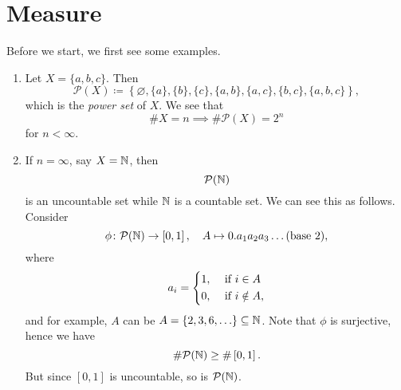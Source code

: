 \section{Measure}
\begin{eg}
	Before we start, we first see some examples.
	\begin{enumerate}
		\item Let \(X = \{a, b, c\}\). Then
		      \[
			      \mathcal{P}(X)\coloneqq \left\{\varnothing , \{a\}, \{b\}, \{c\}, \{a, b\}, \{a, c\}, \{b, c\}, \{a, b, c\}\right\},
		      \]
		      which is the \emph{power set} of \(X\). We see that
		      \[
			      \# X = n \implies \# \mathcal{P}(X) = 2^n
		      \]
		      for \(n< \infty\).
		\item If \(n = \infty\), say \(X = \mathbb{\MakeUppercase{N}} \), then
		      \[
			      \mathcal{P} (\mathbb{\MakeUppercase{N}} )
		      \]
		      is an uncountable set while \(\mathbb{\MakeUppercase{N}}\) is a countable set. We can see this as follows. Consider
		      \[
			      \phi\colon \mathcal{P}(\mathbb{\MakeUppercase{N}}) \to \left[0, 1\right],\quad A\mapsto 0.a_1 a_2 a_3 \ldots (\text{base }2),
		      \]
		      where
		      \[
			      a_i = \begin{dcases}
				      1, & \text{ if } i\in A     \\
				      0, & \text{ if } i\notin A,
			      \end{dcases}
		      \]
		      and for example, \(A\) can be
		      \(A = \{2, 3, 6, \ldots  \}\subseteq \mathbb{\MakeUppercase{N}}\). Note that \(\phi\) is surjective, hence we have
		      \[
			      \# \mathcal{P}(\mathbb{\MakeUppercase{N}} ) \geq \#\left[0, 1\right].
		      \]
		      But since \(\left[0, 1\right]\) is uncountable, so is \(\mathcal{P} (\mathbb{\MakeUppercase{N}} )\).
	\end{enumerate}
\end{eg}

